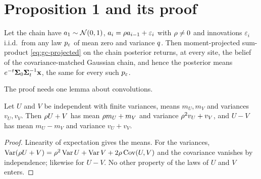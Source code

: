 \section{Proposition 1 and its proof}

\begin{proposition}
\label{prop:gc-lmmse}
Let the chain have $a_1\sim\mathcal{N}\!\left(0,1\right)$, $a_i=\rho a_{i-1}+\varepsilon_i$ with
$\rho\ne0$ and innovations $\varepsilon_i$ i.i.d.\ from any law $p_{\varepsilon}$ of mean zero
and variance $q$. Then moment-projected sum-product \cref{eq:gc-projected} on the
chain posterior returns, at every site, the belief of the covariance-matched Gaussian
chain, and hence the posterior means $e^{-t}\mathbf{\Sigma}_0\mathbf{\Sigma}_t^{-1}\mathbf{x}$, the same for every
such $p_{\varepsilon}$.
\end{proposition}

The proof needs one lemma about convolutions.

\begin{lemma}
\label{lem:gc-conv}
Let $U$ and $V$ be independent with finite variances, means $m_U,m_V$ and variances
$v_U,v_V$. Then $\rho U+V$ has mean $\rho m_U+m_V$ and variance $\rho^2v_U+v_V$, and
$U-V$ has mean $m_U-m_V$ and variance $v_U+v_V$.
\end{lemma}
\begin{proof}
Linearity of expectation gives the means. For the variances,
$\operatorname{Var}(\rho U+V)=\rho^2\operatorname{Var} U+\operatorname{Var} V+2\rho\operatorname{Cov}(U,V)$ and the covariance vanishes by
independence; likewise for $U-V$. No other property of the laws of $U$ and $V$ enters.
\end{proof}


